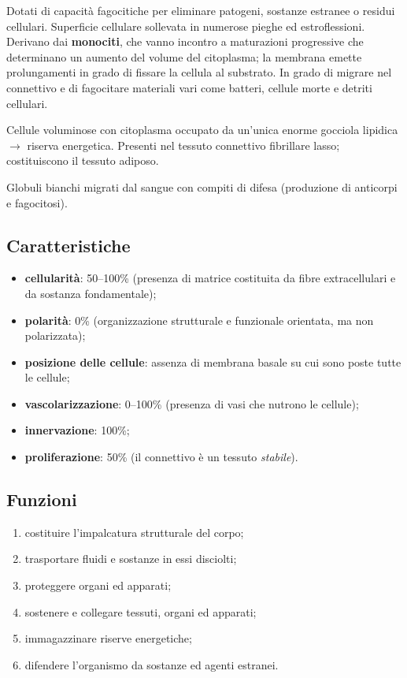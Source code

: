 Dotati di capacità fagocitiche per eliminare patogeni, sostanze estranee o residui cellulari. Superficie cellulare sollevata in numerose pieghe ed estroflessioni. Derivano dai \textbf{monociti}, che vanno incontro a maturazioni progressive che determinano un aumento del volume del citoplasma; la membrana emette prolungamenti in grado di fissare la cellula al substrato. In grado di migrare nel connettivo e di fagocitare materiali vari come batteri, cellule morte e detriti cellulari.

Cellule voluminose con citoplasma occupato da un'unica enorme gocciola lipidica $\rightarrow$ riserva energetica. Presenti nel tessuto connettivo fibrillare lasso; costituiscono il tessuto adiposo.

Globuli bianchi migrati dal sangue con compiti di difesa (produzione di anticorpi e fagocitosi).

\subsection{Caratteristiche}

\begin{itemize}
  \item \textbf{cellularità}: 50--100\% (presenza di matrice costituita da fibre extracellulari e da sostanza fondamentale);
  \item \textbf{polarità}: 0\% (organizzazione strutturale e funzionale orientata, ma non polarizzata);
  \item \textbf{posizione delle cellule}: assenza di membrana basale su cui sono poste tutte le cellule;
  \item \textbf{vascolarizzazione}: 0--100\% (presenza di vasi che nutrono le cellule);
  \item \textbf{innervazione}: 100\%;
  \item \textbf{proliferazione}: 50\% (il connettivo è un tessuto \textit{stabile}).
\end{itemize}

\subsection{Funzioni}

\begin{enumerate}
  \item costituire l'impalcatura strutturale del corpo;
  \item trasportare fluidi e sostanze in essi disciolti;
  \item proteggere organi ed apparati;
  \item sostenere e collegare tessuti, organi ed apparati;
  \item immagazzinare riserve energetiche;
  \item difendere l'organismo da sostanze ed agenti estranei.
\end{enumerate}
